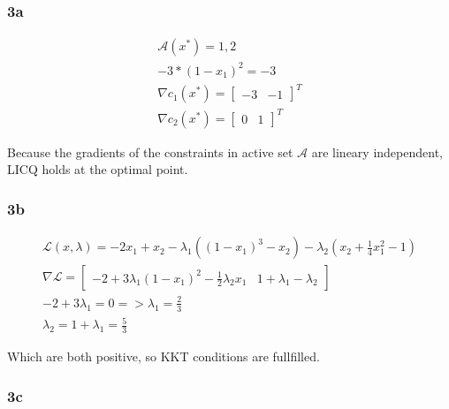 \subsubsection{3a}
\begin{subequations}
    \begin{align}
    \mathcal{A}(x^*) = {1,2} \\ 
    -3*(1-x_1)^2 = -3 \\ 
    \nabla c_1(x^*) = \begin{bmatrix}
        -3 & -1
    \end{bmatrix}^T \\ 
    \nabla c_2(x^*) = \begin{bmatrix}
        0 & 1
    \end{bmatrix}^T
\end{align}
\end{subequations}

Because the gradients of the constraints in active set $\mathcal{A}$ are lineary independent, LICQ holds at the optimal point.

\subsubsection{3b}
\begin{subequations}
    \begin{align}
        \mathcal{L}(x,\lambda) = -2x_1+x_2-\lambda_1((1-x_1)^3-x_2)-\lambda_2(x_2+\frac{1}{4}x_1^2-1) \\ 
        \nabla \mathcal{L} = \begin{bmatrix}
            -2+3\lambda_1(1-x_1)^2-\frac{1}{2}\lambda_2 x_1 & 1+\lambda_1-\lambda_2 
        \end{bmatrix} \\ 
        -2+3\lambda_1= 0 => \lambda_1 = \frac{2}{3} \\ 
            \lambda_2 = 1 + \lambda_1 = \frac{5}{3}
    \end{align}
\end{subequations}

Which are both positive, so KKT conditions are fullfilled.

\subsubsection{3c}

